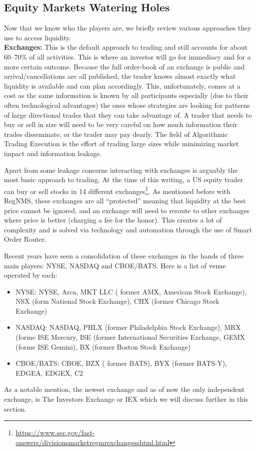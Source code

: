 \subsection{Equity Markets Watering Holes}

Now that we know who the players are, we briefly review various approaches they use to access liquidity. \\

\noindent\textbf{Exchanges:} This is the default approach to trading and still accounts for about 60--70\% of all activities. This is where an investor will go for immediacy and for a more certain outcome. Because the full order-book of an exchange is public and arrival/cancellations are all published, the trader knows almost exactly what liquidity is available and can plan accordingly. This, unfortunately, comes at a cost as the same information is known by all participants especially (due to their often technological advantages) the ones whose strategies are looking for patterns of large directional trades that they can take advantage of. A trader that needs to buy or sell in size will need to be very careful on how much information their trades disseminate, or the trader may pay dearly. The field of Algorithmic Trading Execution is the effort of trading large sizes while minimizing market impact and information leakage. 

Apart from some leakage concerns interacting with exchanges is arguably the most basic approach to trading. At the time of this writing, a US equity trader can buy or sell stocks in 14 different exchanges\footnote{\url{https://www.sec.gov/fast-answers/divisionsmarketregmrexchangesshtml.html}}. As mentioned before with RegNMS, these exchanges are all ``protected'' meaning that liquidity at the best price cannot be ignored, and an exchange will need to reroute to other exchanges where price is better (charging a fee for the honor). This creates a lot of complexity and is solved via technology and automation through the use of Smart Order Router.

Recent years have seen a consolidation of these exchanges in the hands of three main players: NYSE, NASDAQ and CBOE/BATS. Here is a list of venue operated by each:
        \begin{itemize}
        \item NYSE: NYSE, Arca, MKT LLC ( former AMX, American Stock Exchange), NSX (form National Stock Exchange), CHX (former Chicago Stock Exchange)
        \item NASDAQ:  NASDAQ, PHLX (former Philadelphia Stock Exchange), MRX (forme ISE Mercury, ISE (former International Securities Exchange, GEMX (forme ISE Gemini), BX (former Boston Stock Exchange)
        \item CBOE/BATS: CBOE, BZX ( former BATS), BYX (former BATS-Y), EDGEA, EDGEX, C2
        \end{itemize}
As a notable mention, the newest exchange and as of now the only independent exchange, is The Investors Exchange or IEX which we will discuss further in this section.

